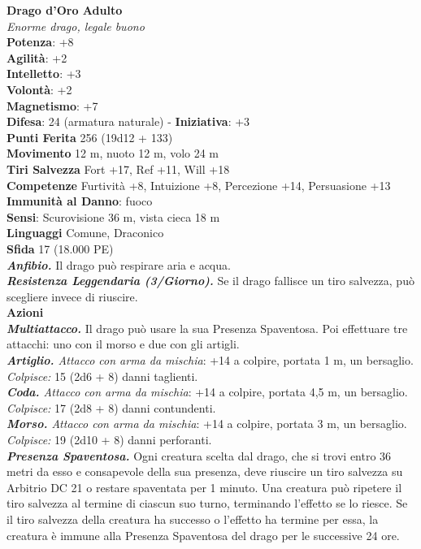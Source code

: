 \begin{multicols}{2}
\medskip\textbf{Drago d'Oro Adulto}\\
\emph{Enorme drago, legale buono}\\
\textbf{Potenza}: +8\\
\textbf{Agilità}: +2\\
\textbf{Intelletto}: +3\\
\textbf{Volontà}: +2\\
\textbf{Magnetismo}: +7\\
\textbf{Difesa}: 24 (armatura naturale) - \textbf{Iniziativa}: +3\\
\textbf{Punti Ferita} 256 (19d12 + 133)\\
\textbf{Movimento} 12 m, nuoto 12 m, volo 24 m\\
\textbf{Tiri Salvezza} Fort +17, Ref +11, Will +18\\
\textbf{Competenze} Furtività +8, Intuizione +8, Percezione +14, Persuasione +13\\
\textbf{Immunità al Danno}: fuoco\\
\textbf{Sensi}: Scurovisione 36 m, vista cieca 18 m\\
\textbf{Linguaggi} Comune, Draconico\\
\textbf{Sfida} 17 (18.000 PE)\smallskip\\
\emph{\textbf{Anfibio.}} Il drago può respirare aria e acqua.\\
\emph{\textbf{Resistenza Leggendaria (3/Giorno).}} Se il drago fallisce un tiro salvezza, può scegliere invece di riuscire.\\
\smallskip\textbf{Azioni}\\
\emph{\textbf{Multiattacco.}} Il drago può usare la sua Presenza Spaventosa. Poi effettuare tre attacchi: uno con il morso e due con gli artigli.\\
\emph{\textbf{Artiglio.} Attacco con arma da mischia}: +14 a colpire, portata 1 m, un bersaglio.\\
\emph{Colpisce:} 15 (2d6 + 8) danni taglienti.\\
\emph{\textbf{Coda.} Attacco con arma da mischia}: +14 a colpire, portata 4,5 m, un bersaglio.\\
\emph{Colpisce:} 17 (2d8 + 8) danni contundenti.\\
\emph{\textbf{Morso.} Attacco con arma da mischia}: +14 a colpire, portata 3 m, un bersaglio.\\
\emph{Colpisce:} 19 (2d10 + 8) danni perforanti.\\
\emph{\textbf{Presenza Spaventosa.}} Ogni creatura scelta dal drago, che si trovi entro 36 metri da esso e consapevole della sua presenza, deve riuscire un tiro salvezza su Arbitrio DC 21 o restare spaventata per 1 minuto. Una creatura può ripetere il tiro salvezza al termine di ciascun suo turno, terminando l'effetto se lo riesce. Se il tiro salvezza della creatura ha successo o l'effetto ha termine per essa, la creatura è immune alla Presenza Spaventosa del drago per le successive 24 ore.\\

\end{multicols}
